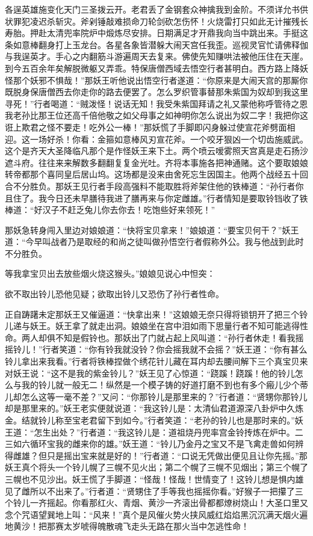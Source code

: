 \documentclass[12pt,UTF8]{ctexbook}
\begin{document}
各逞英雄施变化天门三圣拨云开。老君丢了金钢套众神擒我到金阶。不须详允书供状罪犯凌迟杀斩灾。斧剁锤敲难损命刀轮剑砍怎伤怀！火烧雷打只如此无计摧残长寿胎。押赴太清兜率院炉中煅炼尽安排。日期满足才开鼎我向当中跳出来。手挺这条如意棒翻身打上玉龙台。各星各象皆潜躲大闹天宫任我歪。巡视灵官忙请佛释伽与我逞英才。手心之内翻筋斗游遍周天去复来。佛使先知赚哄法被他压住在天崖。到今五百余年矣解脱微躯又弄乖。特保唐僧西域去悟空行者甚明白。西方路上降妖怪那个妖邪不惧哉！”那妖王听他说出悟空行者遂道：“你原来是大闹天宫的那厮你既脱身保唐僧西去你走你的路去便罢了。怎么罗织管事替那朱紫国为奴却到我这里寻死！”行者喝道：“贼泼怪！说话无知！我受朱紫国拜请之礼又蒙他称呼管待之恩我老孙比那王位还高千倍他敬之如父母事之如神明你怎么说出为奴二字！我把你这诳上欺君之怪不要走！吃外公一棒！”那妖慌了手脚即闪身躲过使宣花斧劈面相迎。这一场好杀！你看：金箍如意棒风刃宣花斧。一个咬牙狠凶一个切齿施威武。这个是齐天大圣降临凡那个是作怪妖王来下土。两个喷云嗳雾照天宫真是走石扬沙遮斗府。往往来来解数多翻翻复复金光吐。齐将本事施各把神通赌。这个要取娘娘转帝都那个喜同皇后居山坞。这场都是没来由舍死忘生因国主。他两个战经五十回合不分胜负。那妖王见行者手段高强料不能取胜将斧架住他的铁棒道：“孙行者你且住了。我今日还未早膳待我进了膳再来与你定雌雄。”行者情知是要取铃铛收了铁棒道：“好汉子不赶乏兔儿你去你去！吃饱些好来领死！”

那妖急转身闯入里边对娘娘道：“快将宝贝拿来！”娘娘道：“要宝贝何干？”妖王道：“今早叫战者乃是取经的和尚之徒叫做孙悟空行者假称外公。我与他战到此时不分胜负。

等我拿宝贝出去放些烟火烧这猴头。”娘娘见说心中怛突：

欲不取出铃儿恐他见疑；欲取出铃儿又恐伤了孙行者性命。

正自踌躇未定那妖王又催逼道：“快拿出来！”这娘娘无奈只得将锁钥开了把三个铃儿递与妖王。妖王拿了就走出洞。娘娘坐在宫中泪如雨下思量行者不知可能逃得性命。两人却俱不知是假铃也。那妖出了门就占起上风叫道：“孙行者休走！看我摇摇铃儿！”行者笑道：“你有铃我就没铃？你会摇我就不会摇？”妖王道：“你有甚么铃儿拿出来我看。”行者将铁棒捏做个绣花针儿藏在耳内却去腰间解下三个真宝贝来对妖王说：“这不是我的紫金铃儿？”妖王见了心惊道：“跷蹊！跷蹊！他的铃儿怎么与我的铃儿就一般无二！纵然是一个模子铸的好道打磨不到也有多个瘢儿少个蒂儿却怎么这等一毫不差？”又问：“你那铃儿是那里来的？”行者道：“贤甥你那铃儿却是那里来的。”妖王老实便就说道：“我这铃儿是：太清仙君道源深八卦炉中久炼金。结就铃儿称至宝老君留下到如今。”行者笑道：“老孙的铃儿也是那时来的。”妖王道：“怎生出处？”行者道：“我这铃儿是：道祖烧丹兜率宫金铃抟炼在炉中。二三如六循环宝我的雌来你的雄。”妖王道：“铃儿乃金丹之宝又不是飞禽走兽如何辨得雌雄？但只是摇出宝来就是好的！”行者道：“口说无凭做出便见且让你先摇。”那妖王真个将头一个铃儿幌了三幌不见火出；第二个幌了三幌不见烟出；第三个幌了三幌也不见沙出。妖王慌了手脚道：“怪哉！怪哉！世情变了！这铃儿想是惧内雄见了雌所以不出来了。”行者道：“贤甥住了手等我也摇摇你看。”好猴子一把攥了三个铃儿一齐摇起。你看那红火、青烟、黄沙一齐滚出骨都都燎树烧山！大圣口里又念个咒语望巽地上叫：“风来！”真个是风催火势火挟风威红焰焰黑沉沉满天烟火遍地黄沙！把那赛太岁唬得魄散魂飞走头无路在那火当中怎逃性命！
\end{document}
